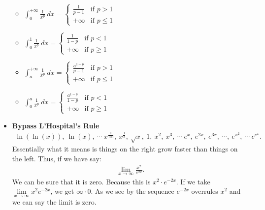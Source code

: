 \documentclass{report}
\begin{document}
\begin{itemize}
\begin{itemize}
                \item $\int_{0}^{+\infty} \frac{1}{x^{p}}\ dx =  
                    \begin{cases}
                        \frac{1}{p-1} & \text{if } p>1 \\
                        +\infty & \text{if } p \leq 1
                    \end{cases}$
                \item $\int_{0}^{1} \frac{1}{x^p}\ dx =    
                    \begin{cases}
                        \frac{1}{1-p} & \text{if } p<1 \\
                        +\infty & \text{if } p \geq 1
                    \end{cases}$
                \item $\int_{a}^{+\infty} \frac{1}{x^{p}}\ dx =  
                    \begin{cases}
                        \frac{a^{1-p}}{p-1} & \text{if } p>1 \\
                        +\infty & \text{if } p \leq 1
                    \end{cases}$
                \item $\int_{0}^{a} \frac{1}{x^p}\ dx =    
                    \begin{cases}
                        \frac{a^{1-p}}{1-p} & \text{if } p<1 \\
                        +\infty & \text{if } p \geq 1
                    \end{cases}$
            \end{itemize}
        \item \textbf{Bypass L'Hospital's Rule}
            \begin{align*}
                \ln{(\ln{(x)})},\ \ln{(x)},\ \cdots\ x^{\frac{1}{100}},\ x^{\frac{1}{3}},\ \sqrt{x},\ 1,\ x^{2},\ x^{3},\ \cdots\ e^{x},\ e^{2x},\ e^{3x},\ \cdots,\ e^{x^{2}},\ \cdots\ e^{e^{x}}
            .\end{align*}
            Essentially what it means is things on the right grow faster than things on the left. Thus, if we have say:
            \begin{align*}
                \lim\limits_{x \to \infty}{\frac{x^{2}}{e^{2x}}} 
            .\end{align*}
            We can be sure that it is zero. Because this is $x^{2}\cdot e^{-2x}$. If we take  $ \lim\limits_{x \to \infty}{x^{2}e^{-2x}}$, we get $\infty \cdot 0$. As we see by the sequence $e^{-2x}$ overrules $x^{2}$ and we can say the limit is zero.

\end{itemize}
\end{document}
